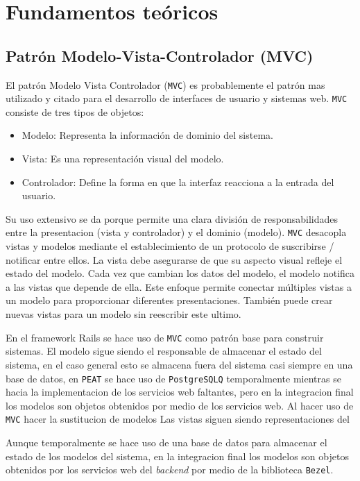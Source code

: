 \chapter{Fundamentos teóricos}

\section{Patrón Modelo-Vista-Controlador (MVC)}
El patrón Modelo Vista Controlador (\texttt{MVC}) es probablemente el patrón
mas utilizado y citado para el desarrollo de interfaces de usuario y sistemas web.
\texttt{MVC} consiste de tres tipos de objetos:

\begin{itemize}
\item Modelo: Representa la información de dominio del sistema.
\item Vista: Es una representación visual del modelo.
\item Controlador: Define la forma en que la interfaz reacciona a la entrada
  del usuario.
\end{itemize}


Su uso extensivo se da porque permite una clara división de responsabilidades
entre la presentacion (vista y controlador) y el dominio (modelo).
\texttt{MVC} desacopla vistas y modelos mediante el establecimiento de un
protocolo de suscribirse / notificar entre ellos. La vista debe asegurarse
de que su aspecto visual refleje el estado del modelo. Cada vez que cambian
los datos del modelo, el modelo notifica a las vistas que depende de ella.
Este enfoque permite conectar múltiples vistas a un modelo para proporcionar
diferentes presentaciones. También puede crear nuevas vistas para un modelo
sin reescribir este ultimo.

En el framework Rails se hace uso de \texttt{MVC} como patrón base para
construir sistemas. El modelo sigue siendo el responsable de almacenar
el estado del sistema, en el caso general esto se almacena fuera del sistema
casi siempre en una base de datos, en \texttt{PEAT} se hace uso de
\texttt{PostgreSQLQ} temporalmente mientras se hacia la implementacion
de los servicios web faltantes, pero en la integracion final los modelos
son objetos obtenidos por medio de los servicios web. Al hacer uso de \texttt{MVC}
hacer la sustitucion de modelos 
Las vistas siguen siendo representaciones del 


Aunque temporalmente se hace uso de una base de datos para almacenar
el estado de los modelos del sistema, en la integracion final los modelos
son objetos obtenidos por los servicios web del \textit{backend} por
medio de la biblioteca \texttt{Bezel}.
